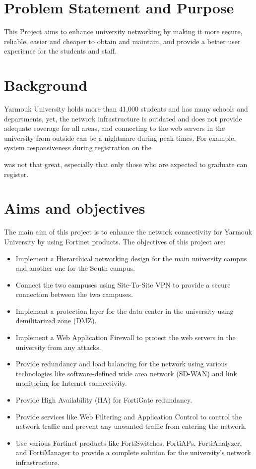 \documentclass[12pt]{report}
\begin{document}
\section{Problem Statement and Purpose}
This Project aims to enhance university networking by making it more secure, 
reliable, easier and cheaper to obtain and maintain, and provide a better user experience for the students and staff.



\section{Background}
Yarmouk University holds more than 41,000 students \cite{YU} and has many schools and departments, yet, the network infrastructure is outdated and does not provide adequate coverage for all areas, and connecting to the web servers in the university from outside can be a nightmare during peak times. For example, system responsiveness during registration on the \date{19th of May, 2024} was not that great, especially that only those who are expected to graduate can register.
\section{Aims and objectives}
The main aim of this project is to enhance the network connectivity for Yarmouk University by using Fortinet products. The objectives of this project are:
\begin{itemize}
    \item Implement a Hierarchical networking design for the main university campus and another one for the South campus.
    \item Connect the two campuses using Site-To-Site VPN to provide a secure connection between the two campuses.
    \item Implement a protection layer for the data center in the university using demilitarized zone (DMZ).
    \item Implement a Web Application Firewall to protect the web servers in the university from any attacks.
    \item Provide redundancy and load balancing for the network using various technologies like software-defined wide area network (SD-WAN) and link monitoring for Internet connectivity.
    \item Provide High Availability (HA) for FortiGate redundancy.
    \item Provide services like Web Filtering and Application Control to control the network traffic and prevent any unwanted traffic from entering the network.
    \item Use various Fortinet products like FortiSwitches, FortiAPs, FortiAnalyzer, and FortiManager to provide a complete solution for the university's network infrastructure.
\end{itemize}
\end{document}
